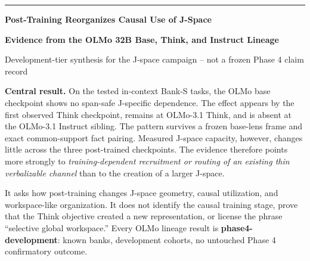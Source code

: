 \documentclass[11pt]{article}
\begin{document}

\begin{titlepage}
\thispagestyle{empty}
\vspace*{0.48in}
{\color{violetdark}\rule{\textwidth}{2.2pt}}
\vspace{0.33in}

{\Huge\bfseries\color{ink} Post-Training Reorganizes Causal Use of J-Space\par}
\vspace{0.13in}
{\LARGE\bfseries\color{violetdark} Evidence from the OLMo 32B Base, Think, and Instruct Lineage\par}

\vspace{0.35in}
{\large Development-tier synthesis for the J-space campaign -- not a frozen Phase 4 claim record\par}

\vspace{0.46in}
\begin{tcolorbox}[enhanced,colback=lavender,colframe=violet,boxrule=1pt,arc=2mm,left=4mm,right=4mm,top=3mm,bottom=3mm]
\textbf{Central result.} On the tested in-context Bank-S tasks, the OLMo base
checkpoint shows no span-safe J-specific dependence. The effect appears by the
first observed Think checkpoint, remains at OLMo-3.1 Think, and is absent at
the OLMo-3.1 Instruct sibling. The pattern survives a frozen base-lens frame
and exact common-support fact pairing. Measured J-space capacity, however,
changes little across the three post-trained checkpoints. The evidence therefore
points more strongly to \emph{training-dependent recruitment or routing of an
existing thin verbalizable channel} than to the creation of a larger J-space.
\end{tcolorbox}

\vspace{0.28in}
\begin{statusbox}[title={What this document does and does not claim}]
It asks how post-training changes J-space geometry, causal utilization, and
workspace-like organization. It does not identify the causal training stage,
prove that the Think objective created a new representation, or license the
phrase ``selective global workspace.'' Every OLMo lineage result is
\textbf{phase4-development}: known banks, development cohorts, no untouched
Phase 4 confirmatory outcome.
\end{statusbox}


\end{titlepage}
\end{document}

